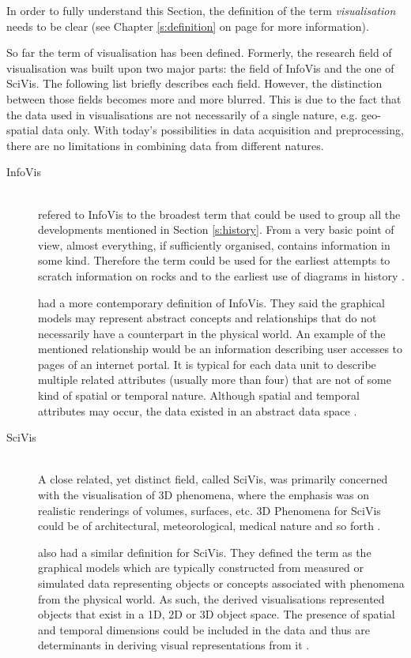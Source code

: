 \cbstart
In order to fully understand this Section, the definition of the term \textit{visualisation} needs to be clear (see Chapter \ref{s:definition} on page \pageref{s:definition} for more information).

So far the term of visualisation has been defined. Formerly, the research field of visualisation was built upon two major parts: the field of \ac{InfoVis} and the one of \ac{SciVis}. The following list briefly describes each field. However, the distinction between those fields becomes more and more blurred. This is due to the fact that the data used in visualisations are not necessarily of a single nature, e.g. geo-spatial data only. With today's possibilities in data acquisition and preprocessing, there are no limitations in combining data from different natures.

\begin{description}

\item[\acl{InfoVis}] \hfill \\
\citeauthor{Friendly.2001} refered to \ac{InfoVis} to the broadest term that could be used to group all the developments mentioned in Section \ref{s:history}. From a very basic point of view, almost everything, if sufficiently organised, contains information in some kind. Therefore the term could be used for the earliest attempts to scratch information on rocks and to the earliest use of diagrams in history .

\citeauthor{Ferreira2003} had a more contemporary definition of \ac{InfoVis}. They said the graphical models may represent abstract concepts and relationships that do not necessarily have a counterpart in the physical world. An example of the mentioned relationship would be an information describing user accesses to pages of an internet portal. It is typical for each data unit to describe multiple related attributes (usually more than four) that are not of some kind of spatial or temporal nature. Although spatial and temporal attributes may occur, the data existed in an abstract data space .
\newpage
\item[\acl{SciVis}] \hfill \\
A close related, yet distinct field, called \ac{SciVis}, was primarily concerned with the visualisation of 3D phenomena, where the emphasis was on realistic renderings of volumes, surfaces, etc. 3D Phenomena for \ac{SciVis} could be of architectural, meteorological, medical nature and so forth .

\citeauthor{Ferreira2003} also had a similar definition for \ac{SciVis}. They defined the term as the graphical models which are typically constructed from measured or simulated data representing objects or concepts associated with phenomena from the physical world. As such, the derived visualisations represented objects that exist in a 1D, 2D or 3D object space. The presence of spatial and temporal dimensions could be included in the data and thus are determinants in deriving visual representations from it .
\end{description}

